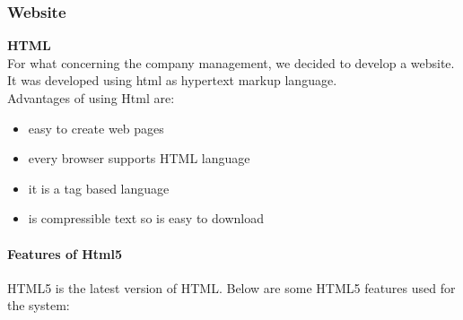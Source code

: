 \subsubsection{Website}



\textbf{HTML} \\
For what concerning the company management, we decided to develop a website.\\
It was developed using html as hypertext markup language.\\
Advantages of using Html are:
\begin{itemize}
    \item easy to create web pages
    \item every browser supports HTML language
    \item it is a tag based language
    \item is compressible text so is easy to download
\end{itemize}

\paragraph{Features of Html5}
HTML5 is the latest version of HTML. Below are some HTML5 features used for the system:

